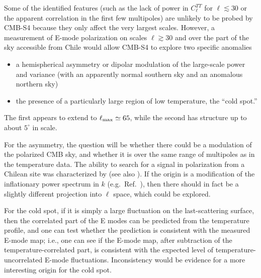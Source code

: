 Some of the identified features (such as the lack of power in $C_\ell^{TT}$
for $\ell\lesssim30$ or the apparent correlation in the first few multipoles)
are unlikely to be probed by CMB-S4 because they only affect the very largest scales.
However, a measurement of E-mode polarization on scales $\ell\gtrsim 30$ and over the 
part of the sky accessible from Chile would allow CMB-S4 to explore two specific anomalies

\begin{itemize}
  \item a hemispherical asymmetry or dipolar modulation of the large-scale
  power and variance (with an apparently normal southern sky  and an anomalous northern sky) 
  \item the presence of a particularly large region of low temperature,
  the ``cold spot.''
\end{itemize}

The first \cite{Eriksen:2003db, Ade:2015hxq} appears to extend to $\ell_{\rm max}\simeq65$, while the second \cite{Vielva:2003et, Ade:2015hxq} has
structure up to about $5^\circ$ in scale. 

For the asymmetry, the question will be whether there could be a modulation
of the polarized CMB sky, and whether it is over the same range of
multipoles as in the temperature data. The ability to search for a signal in 
polarization from a Chilean site was characterized by \cite{O'Dwyer:2016lna} 
(see also \cite{Bunn:2016kwh}).
If the origin is a modification of the inflationary power
spectrum in $k$ (e.g.\ Ref.~\cite{Gordon:2005ai}),
then there should in fact be a slightly different projection
into $\ell$ space, which could be explored. 


For the cold spot, if it is simply a large fluctuation
on the last-scattering surface, then the correlated part of the E modes can
be predicted from the temperature profile, and one can test whether the prediction
is consistent with the measured E-mode map; i.e., one can see if the E-mode map, after subtraction
of the temperature-correlated part, is consistent with the expected level of temperature-uncorrelated E-mode fluctuations. Inconsistency would be evidence for a more interesting origin for the cold spot. 


